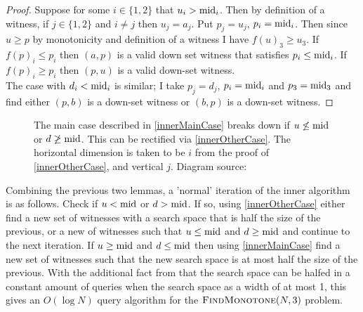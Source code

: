\begin{proof}
  Suppose for some $i \in \{1, 2\}$ that $u_i > \mathrm{mid}_i$. Then
  by definition of a witness, if $j \in \{1, 2\}$ and $i \neq j$ then $u_j = a_j$.
  Put $p_j = u_j$, $p_i = \mathrm{mid}_i$. Then since $u \geq p$ by monotonicity
  and definition of a witness I have $f(u)_3 \geq u_3$. If $f(p)_i \leq p_i$ then
  $(a, p)$ is a valid down set witness that satisfies $p_i \leq \mathrm{mid}_i$. If
  $f(p)_i \geq p_i$ then $(p, u)$ is a valid down-set witness. \\
  The case with $d_i < \mathrm{mid}_i$ is similar; I take $p_j = d_j$, $p_i = \mathrm{mid}_i$ and $p_3 = \mathrm{mid}_3$
  and find either $(p, b)$ is a down-set witness or $(b, p)$ is a down-set witness.
\end{proof}
\begin{figure}[ht]
  \centering
  \scalebox{0.5}{}
  \caption{The main case described in \cref{innerMainCase} breaks down if $u \not\leq \mathrm{mid}$ or $d \not\geq \mathrm{mid}$.
  This can be rectified via \cref{innerOtherCase}. The horizontal dimension is taken
  to be $i$ from the proof of \cref{innerOtherCase}, and vertical $j$. Diagram source: \citep{fasterTarski}}
\end{figure}
Combining
the previous two lemmas, a 'normal' iteration of the inner algorithm is as follows.
Check if $u < \mathrm{mid}$ or $d > \mathrm{mid}$. If so, using \cref{innerOtherCase} either find a new
set of witnesses with a search space that is half the size of the previous, or a new of
witnesses such that $u \leq \mathrm{mid}$ and $d \geq \mathrm{mid}$ and continue to the next iteration.
If $u \geq \mathrm{mid}$ and $d \leq \mathrm{mid}$ then using \cref{innerMainCase} find a new set of witnesses
such that the new search space is at most half the size of the previous.
With the additional fact from \citep{fasterTarski} that the search space can be halfed in a constant amount of
queries when the search space as a width of at most 1, this gives an $O(\log N)$ query algorithm
for the $\textsc{FindMonotone}(N, 3)$ problem.

